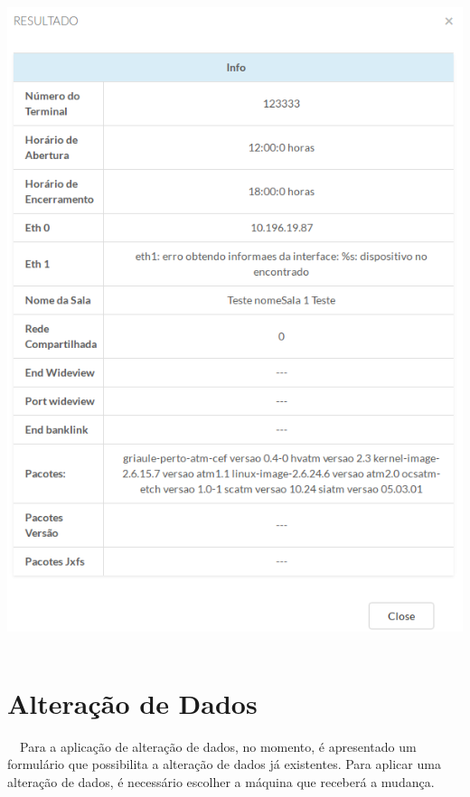     \begin{center}
    \includegraphics[width=13.936cm,height=19.131cm]{figuras/RATCETECATMSTFLS051718v2-img004.png}
    \end{center}

    \bigskip


    \bigskip

    \section[Altera\c{c}\~ao de Dados]{Altera\c{c}\~ao de Dados}
{\color{black}
    \ \ Para a aplica\c{c}\~ao de altera\c{c}\~ao de dados, no momento, \'e apresentado um formul\'ario que possibilita a
        altera\c{c}\~ao de dados j\'a existentes. Para aplicar uma altera\c{c}\~ao de dados, \'e necess\'ario escolher a
        m\'aquina que receber\'a a mudan\c{c}a.}

